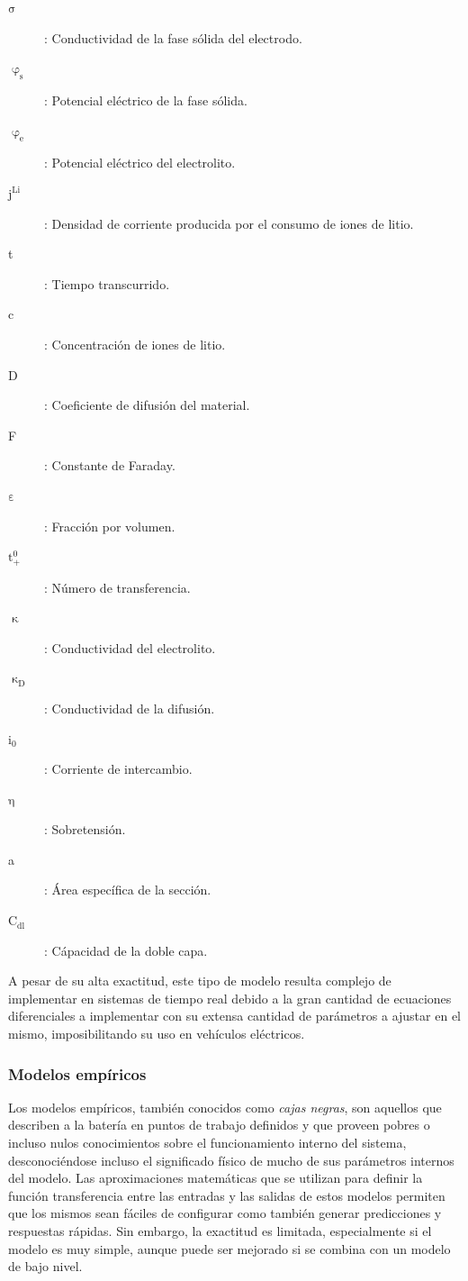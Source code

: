\documentclass[10pt,a4paper]{article}
\begin{document}
\begin{description}
    \item [$\mathrm{\sigma}$]: Conductividad de la fase s\'olida del
        electrodo.
    \item [$\mathrm{\upvarphi_s}$]: Potencial el\'ectrico de la fase
        s\'olida.
    \item [$\mathrm{\upvarphi_e}$]: Potencial el\'ectrico del
        electrolito.
    \item [$\mathrm{j^{Li}}$]: Densidad de corriente producida por el
        consumo de iones de litio.
    \item [t]: Tiempo transcurrido.
    \item [c]: Concentraci\'on de iones de litio.
    \item [D]: Coeficiente de difusi\'on del material.
    \item [F]: Constante de Faraday.
    \item [$\mathrm{\varepsilon}$]: Fracci\'on por volumen.
    \item [$\mathrm{t_+^0}$]: N\'umero de transferencia.
    \item [$\mathrm{\upkappa}$]: Conductividad del electrolito.
    \item [$\mathrm{\upkappa_D}$]: Conductividad de la difusi\'on.
    \item [$\mathrm{i_0}$]: Corriente de intercambio.
    \item [$\mathrm{\eta}$]: Sobretensi\'on.
    \item [a]: \'Area espec\'ifica de la secci\'on.
    \item [$\mathrm{C_{dl}}$]: C\'apacidad de la doble capa.
\end{description}

A pesar de su alta exactitud, este tipo de modelo resulta complejo de
implementar en sistemas de tiempo real debido a la gran cantidad de ecuaciones
diferenciales a implementar con su extensa cantidad de par\'ametros a ajustar en
el mismo, imposibilitando su uso en veh\'iculos el\'ectricos.

\subsubsection{Modelos emp\'iricos}\label{empModels}

\noindent Los modelos emp\'iricos, tambi\'en conocidos como \emph{cajas negras},
son aquellos que describen a la batería en puntos de trabajo definidos y que
proveen pobres o incluso nulos conocimientos sobre el funcionamiento interno del
sistema, desconociéndose incluso el significado f\'isico de mucho de sus
par\'ametros internos del modelo. Las aproximaciones matem\'aticas que se
utilizan para definir la funci\'on transferencia entre las entradas y las
salidas de estos modelos permiten que los mismos sean f\'aciles de configurar
como tambi\'en generar predicciones y respuestas r\'apidas. Sin embargo, la
exactitud es limitada, especialmente si el modelo es muy simple, aunque puede
ser mejorado si se combina con un modelo de bajo nivel.
\end{document}
